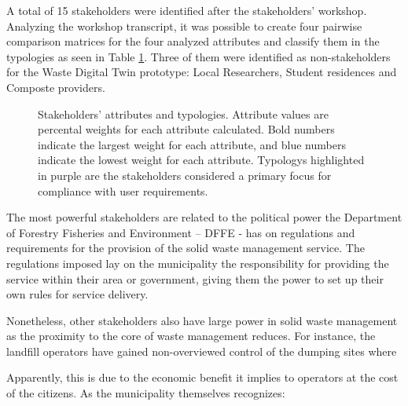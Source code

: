 \documentclass[authoryear,preprint,review,12pt]{elsarticle}
\begin{document}
    A total of 15 stakeholders were identified after the stakeholders' workshop. Analyzing the workshop transcript, it was possible to create four pairwise comparison matrices for the four analyzed attributes and classify them in the typologies as seen in Table \ref{tab:stakeholderTyp}. Three of them were identified as non-stakeholders for the Waste Digital Twin prototype: Local Researchers, Student residences and Composte providers.

    \begin{figure}[h]
        \caption{Stakeholders' attributes and typologies. Attribute values are percental weights for each attribute calculated. Bold numbers indicate the largest weight for each attribute, and blue numbers indicate the lowest weight for each attribute. Typologys highlighted in purple are the stakeholders considered a primary focus for compliance with user requirements.}
        \label{tab:stakeholderTyp}    
    \end{figure}

    The most powerful stakeholders are related to the political power the Department of Forestry Fisheries and Environment – DFFE - has on regulations and requirements for the provision of the solid waste management service. The regulations imposed lay on the municipality the responsibility for providing the service within their area or government, giving them the power to set up their own rules for service delivery.

    Nonetheless, other stakeholders also have large power in solid waste management as the proximity to the core of waste management reduces. For instance, the landfill operators have gained non-overviewed control of the dumping sites where

    \begin{quotation}
    \end{quotation}

    Apparently, this is due to the economic benefit it implies to operators at the cost of the citizens. As the municipality themselves recognizes:

    \begin{quotation}
    \end{quotation}
\end{document}
